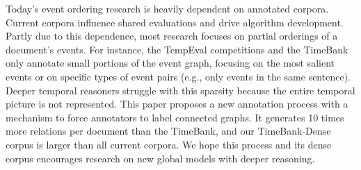 Today's event ordering research is heavily dependent on annotated corpora. Current corpora influence shared evaluations and drive algorithm development. Partly due to this dependence, most research focuses on partial orderings of a document's events. For instance, the TempEval competitions and the TimeBank only annotate small portions of the event graph, focusing on the most salient events or on specific types of event pairs (e.g., only events in the same sentence). Deeper temporal reasoners struggle with this sparsity because the entire temporal picture is not represented. This paper proposes a new annotation process with a mechanism to force annotators to label connected graphs. It generates 10 times more relations per document than the TimeBank, and our TimeBank-Dense corpus is larger than all current corpora. We hope this process and its dense corpus encourages research on new global models with deeper reasoning.
